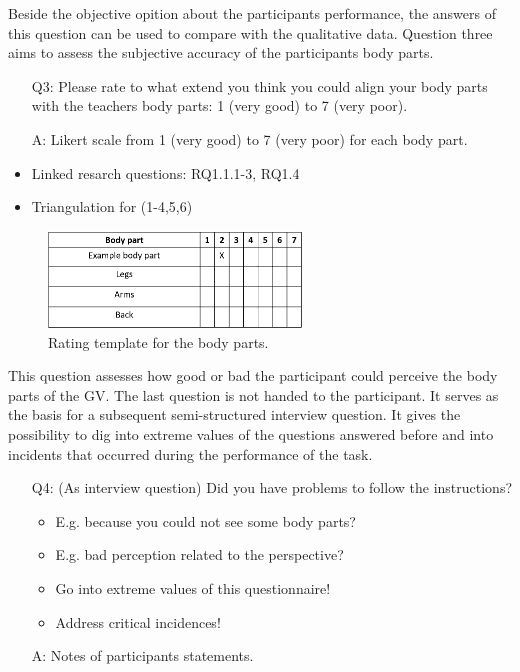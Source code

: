 Beside the objective opition about the participants performance, the answers of this question can be used to compare with the qualitative data. Question three aims to assess the subjective accuracy of the participants body parts.
\begin{itemize}
	\item[Q3:] Please rate to what extend you think you could align your body parts with the teachers body parts: 1 (very good) to 7 (very poor). 
	\item[A:] Likert scale from 1 (very good) to 7 (very poor) for each body part.
	\item Linked resarch questions: RQ1.1.1-3, RQ1.4
	\item Triangulation for (1-4,5,6)
\end{itemize} 
\begin{figure}[H]
	\centering
	\includegraphics[width=0.6\textwidth]{figures/body-parts-acc.png}
	\caption[Rating template: body parts]{Rating template for the body parts.}
	\label{fig:bodypartsacc}
\end{figure}
This question assesses how good or bad the participant could perceive the body parts of the GV. The last question is not handed to the participant. It serves as the basis for a subsequent semi-structured interview question. It gives the possibility to dig into extreme values of the questions answered before and into incidents that occurred during the performance of the task.
\begin{itemize}
	\item[Q4:] (As interview question) Did you have problems to follow the instructions? 
	\begin{itemize}
		\item E.g. because you could not see some body parts?
		\item E.g. bad perception related to the perspective?
		\item Go into extreme values of this questionnaire! 
		\item Address critical incidences!
	\end{itemize}
	\item[A:] Notes of participants statements.
\end{itemize}

